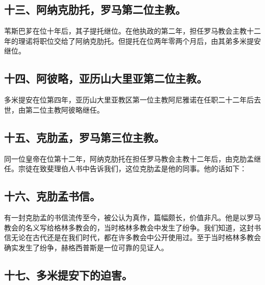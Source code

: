 \subsection{十三、阿纳克肋托，罗马第二位主教。}

苇斯巴芗在位十年后，其子提托继位。在他执政的第二年，担任罗马教会主教十二年的理诺将职位交给了阿纳克肋托。但提托在位两年零两个月后，由其弟多米提安继位。\par


\subsection{十四、阿彼略，亚历山大里亚第二位主教。}

多米提安在位第四年，亚历山大里亚教区第一位主教阿尼雅诺在任职二十二年后去世，由第二位主教阿彼略继任。\par


\subsection{十五、克肋孟，罗马第三位主教。}

同一位皇帝在位第十二年，阿纳克肋托在担任罗马教会主教十二年后，由克肋孟继任。宗徒在致斐理伯人书中告诉我们，这位克肋孟是他的同事。他的话如下：\par


\subsection{十六、克肋孟书信。}

有一封克肋孟的书信流传至今，被公认为真作，篇幅颇长，价值非凡。他是以罗马教会的名义写给格林多教会的，当时格林多教会中发生了纷争。我们知道，这封书信无论在古代还是在我们时代，都在许多教会中公开使用过。至于当时格林多教会确实发生了纷争，赫格西普斯是一位可靠的见证人。\par


\subsection{十七、多米提安下的迫害。}

